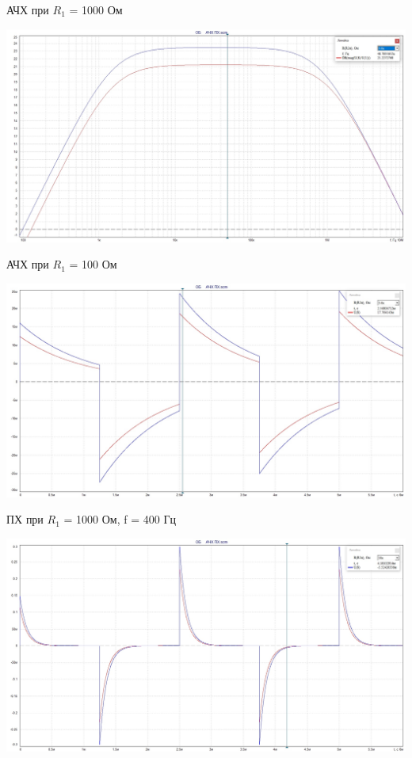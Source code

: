 \documentclass[a4paper,14pt]{extarticle}
\begin{document}
    АЧХ при $R_1$ = 1000 Ом

     \begin{center}
         \includegraphics[scale=0.3]{5.2.jpg}
     \end{center}

    АЧХ при $R_1$ = 100 Ом

    \begin{center}
        \includegraphics[scale=0.3]{5.3.jpg}
    \end{center}

    ПХ при $R_1$ = 1000 Ом, f = 400 Гц

    \begin{center}
        \includegraphics[scale=0.28]{5.4.jpg}
    \end{center}
\end{document}
